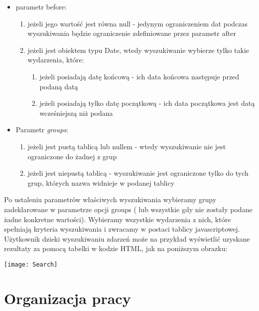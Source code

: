 \documentclass[polish,12pt]{aghthesis}
\begin{document}
\begin{itemize}
	\item parametr before:
	\begin{enumerate}
		\item jeżeli jego wartość jest równa null - jedynym ograniczeniem dat podczas wyszukiwania będzie ograniczenie zdefiniowane przez parametr after
		\item jeżeli jest obiektem typu Date, wtedy wyszukiwanie wybierze tylko takie wydarzenia, które:
		\begin{enumerate}
			\item jeżeli posiadają datę końcową - ich data końcowa następuje przed podaną datą 
			\item jeżeli posiadają tylko datę początkową - ich data początkowa jest datą wcześniejszą niż podana
		\end{enumerate}
	\end{enumerate}
\end{itemize}


\begin{itemize}
	\item Parametr \textit{groups}:
	\begin{enumerate}
		\item jeżeli jest pustą tablicą lub nullem - wtedy wyszukiwanie nie jest ograniczone do żadnej z grup
		\item jeżeli jest niepustą tablicą - wyszukiwanie jest ograniczone tylko do tych grup, których nazwa widnieje w podanej tablicy
	\end{enumerate}
\end{itemize}

Po ustaleniu parametrów właściwych wyszukiwania wybieramy grupy zadeklarowane                 w parametrze opcji groups ( lub wszystkie gdy nie zostały podane żadne konkretne wartości). Wybieramy wszystkie wydarzenia z nich, które spełniają kryteria wyszukiwania i zwracamy w postaci tablicy javascriptowej.\\

\clearpage
Użytkownik dzieki wyszukiwaniu zdarzeń może na przykład wyświetlić uzyskane rezultaty za pomocą tabelki w kodzie HTML, jak na poniższym obrazku:

\texttt{[image: Search]}


\section{Organizacja pracy}
\label{sec:organizacja-pracy}
\end{document}
